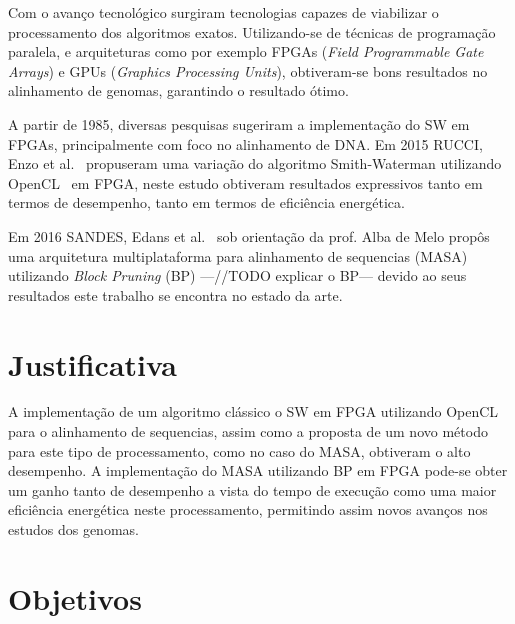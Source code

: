 \documentclass[12pt, a4paper]{article}
\numberwithin{table}{section}
\begin{document}
Com o avanço tecnológico surgiram tecnologias capazes de viabilizar o processamento
dos algoritmos exatos. Utilizando-se de técnicas de programação paralela, e 
arquiteturas como por exemplo FPGAs (\textit{Field Programmable Gate Arrays}) e GPUs 
(\textit{Graphics Processing Units}), obtiveram-se bons resultados no alinhamento
de genomas, garantindo o resultado ótimo. 

A partir de 1985, diversas pesquisas sugeriram a implementação do SW em FPGAs,
principalmente com foco no alinhamento de DNA. 
Em 2015 RUCCI, Enzo et al.~\cite{7345650} propuseram uma variação do algoritmo
Smith-Waterman utilizando OpenCL~\cite{Stone:2010:OPP:2220077.2220227} em FPGA,
neste estudo obtiveram resultados expressivos tanto em termos de desempenho, 
tanto em termos de eficiência energética. 

Em 2016 SANDES, Edans et al.~\cite{DeO.Sandes:2016:MMA:2888415.2858656} sob
orientação da prof. Alba de Melo propôs uma arquitetura multiplataforma para
alinhamento de sequencias (MASA) utilizando \textit{Block Pruning} (BP) 
---//TODO explicar o BP--- 
devido ao seus resultados este trabalho se encontra no estado da arte.

\section{Justificativa}
\label{sec:justificativa}

A implementação de um algoritmo clássico o SW em FPGA utilizando OpenCL para o 
alinhamento de sequencias, assim como a proposta de um novo método para este
tipo de processamento, como no caso do MASA, obtiveram o alto desempenho. 
A implementação do MASA utilizando BP em FPGA pode-se obter um ganho tanto 
de desempenho a vista do tempo de execução como uma maior eficiência energética
neste processamento, permitindo assim novos avanços nos estudos dos genomas.


\section{Objetivos}
\label{sec:objetivos}
\end{document}
